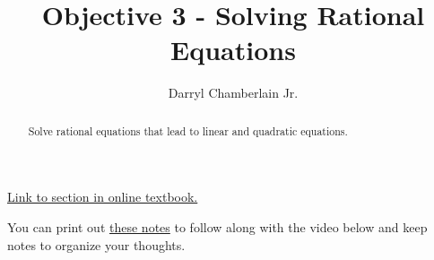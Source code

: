 \documentclass{ximera}
\author{Darryl Chamberlain Jr.}
\title{Objective 3 - Solving Rational Equations}
\begin{document}
\begin{abstract}
Solve rational equations that lead to linear and quadratic equations.
\end{abstract}
\maketitle

\href{https://cnx.org/contents/mwjClAV_@8.1:KNTP2r7D@13/Rational-Functions}{Link to section in online textbook.}


You can print out \href{http://people.clas.ufl.edu/dchamberlain31/files/M7-Objective-3-Solve-Rational-Equalities.pdf}{these notes} to follow along with the video below and keep notes to organize your thoughts.

\end{document}
